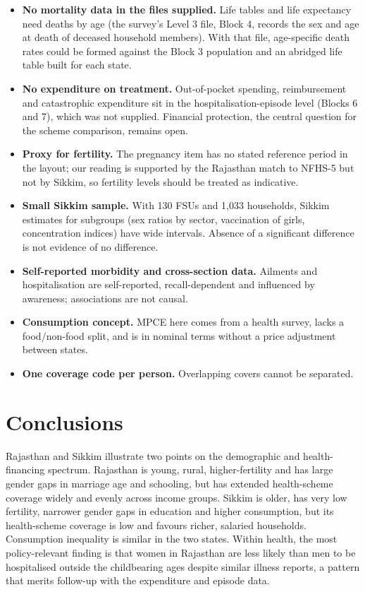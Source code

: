 \documentclass[10pt,a4paper]{article}
\begin{document}
\begin{itemize}
\item \textbf{No mortality data in the files supplied.} Life tables and life expectancy need deaths by age (the survey's Level 3 file, Block 4, records the sex and age at death of deceased household members). With that file, age-specific death rates could be formed against the Block 3 population and an abridged life table built for each state.
\item \textbf{No expenditure on treatment.} Out-of-pocket spending, reimbursement and catastrophic expenditure sit in the hospitalisation-episode level (Blocks 6 and 7), which was not supplied. Financial protection, the central question for the scheme comparison, remains open.
\item \textbf{Proxy for fertility.} The pregnancy item has no stated reference period in the layout; our reading is supported by the Rajasthan match to NFHS-5 but not by Sikkim, so fertility levels should be treated as indicative.
\item \textbf{Small Sikkim sample.} With 130 FSUs and 1,033 households, Sikkim estimates for subgroups (sex ratios by sector, vaccination of girls, concentration indices) have wide intervals. Absence of a significant difference is not evidence of no difference.
\item \textbf{Self-reported morbidity and cross-section data.} Ailments and hospitalisation are self-reported, recall-dependent and influenced by awareness; associations are not causal.
\item \textbf{Consumption concept.} MPCE here comes from a health survey, lacks a food/non-food split, and is in nominal terms without a price adjustment between states.
\item \textbf{One coverage code per person.} Overlapping covers cannot be separated.
\end{itemize}

\section{Conclusions}

Rajasthan and Sikkim illustrate two points on the demographic and health-financing spectrum. Rajasthan is young, rural, higher-fertility and has large gender gaps in marriage age and schooling, but has extended health-scheme coverage widely and evenly across income groups. Sikkim is older, has very low fertility, narrower gender gaps in education and higher consumption, but its health-scheme coverage is low and favours richer, salaried households. Consumption inequality is similar in the two states. Within health, the most policy-relevant finding is that women in Rajasthan are less likely than men to be hospitalised outside the childbearing ages despite similar illness reports, a pattern that merits follow-up with the expenditure and episode data.
\end{document}
